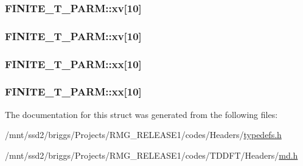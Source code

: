 \hypertarget{struct_f_i_n_i_t_e___t___p_a_r_m_acebe4b0fbc137c5e685368cd65d37a1b}{
\subsubsection[{xv}]{ F\-I\-N\-I\-T\-E\-\_\-\-T\-\_\-\-P\-A\-R\-M\-::xv\mbox{[}10\mbox{]}}}\label{struct_f_i_n_i_t_e___t___p_a_r_m_acebe4b0fbc137c5e685368cd65d37a1b}
\hypertarget{struct_f_i_n_i_t_e___t___p_a_r_m_a6e0098f57a5e662069ff5fd27e83161e}{
\subsubsection[{xv}]{ F\-I\-N\-I\-T\-E\-\_\-\-T\-\_\-\-P\-A\-R\-M\-::xv\mbox{[}10\mbox{]}}}\label{struct_f_i_n_i_t_e___t___p_a_r_m_a6e0098f57a5e662069ff5fd27e83161e}
\hypertarget{struct_f_i_n_i_t_e___t___p_a_r_m_a1309b0eb11c884b7f668560185cf2e42}{
\subsubsection[{xx}]{ F\-I\-N\-I\-T\-E\-\_\-\-T\-\_\-\-P\-A\-R\-M\-::xx\mbox{[}10\mbox{]}}}\label{struct_f_i_n_i_t_e___t___p_a_r_m_a1309b0eb11c884b7f668560185cf2e42}
\hypertarget{struct_f_i_n_i_t_e___t___p_a_r_m_a11d3af6c5375368bad71b2994446dd3b}{
\subsubsection[{xx}]{ F\-I\-N\-I\-T\-E\-\_\-\-T\-\_\-\-P\-A\-R\-M\-::xx\mbox{[}10\mbox{]}}}\label{struct_f_i_n_i_t_e___t___p_a_r_m_a11d3af6c5375368bad71b2994446dd3b}


The documentation for this struct was generated from the following files\-:\begin{DoxyCompactItemize}
\item 
/mnt/ssd2/briggs/\-Projects/\-R\-M\-G\-\_\-\-R\-E\-L\-E\-A\-S\-E1/codes/\-Headers/\hyperlink{_headers_2typedefs_8h}{typedefs.\-h}\item 
/mnt/ssd2/briggs/\-Projects/\-R\-M\-G\-\_\-\-R\-E\-L\-E\-A\-S\-E1/codes/\-T\-D\-D\-F\-T/\-Headers/\hyperlink{md_8h}{md.\-h}\end{DoxyCompactItemize}
